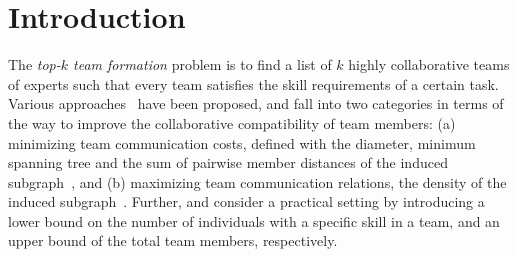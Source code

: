 \section{Introduction}
\label{sec-intro}

The {\em top-$k$ team formation} problem is to find a list of $k$ highly collaborative teams of experts such that every team satisfies the skill requirements of a certain task.
Various approaches~\cite{Lappas09,Kargar11,ArisLuca12,GajewarS12,realTeamForm13,SamikKVM12} have been proposed,
and fall into two categories in terms of the way to improve the collaborative compatibility of team members:
 (a) minimizing team communication costs,
defined with \eg the diameter, minimum spanning tree and the sum of pairwise member distances of the induced subgraph~\cite{Lappas09,Kargar11,ArisLuca12,SamikKVM12}, and
(b) maximizing team communication relations,
\eg the density of the induced subgraph~\cite{GajewarS12,realTeamForm13}.
Further, \cite{GajewarS12} and \cite{realTeamForm13} consider a practical setting by introducing a lower bound on the number of individuals with a specific skill in a team, and an upper bound of the total team members, respectively.


